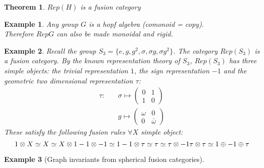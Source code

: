 \documentclass{article}
\newtheorem{example}{Example}
\newtheorem{theorem}{Theorem}
\begin{document}
	\begin{theorem}
		$Rep(H)$ is a fusion category
	\end{theorem}
	
	\begin{example}
		Any group $G$ is a hopf algebra (comonoid = copy).\\
		Therefore $RepG$ can also be made monoidal and rigid.
	\end{example}
	
	\begin{example}
		Recall the group $S_3=\{e, g, g^2, \sigma, \sigma g, \sigma g^2 \}$. The category $Rep(S_3)$ is a fusion category. By the known representation theory of $S_3$, $Rep(S_3)$ has three simple objects: the trivial representation $1$, the sign representation $-1$ and the geometric two dimensional representation $\tau$:
		\begin{equation*}
		\begin{split}
		\tau : \quad & \sigma \mapsto \left( {\begin{array}{cc} 0 & 1 \\ 1 & 0 \end{array}}\right) \\
		& g \mapsto \left( {\begin{array}{cc} \omega & 0 \\ 0 & \bar{\omega} \end{array}}\right)
		\end{split}
		\end{equation*}
		These satisfy the following fusion rules $\forall X$ simple object:
		\begin{equation}
		1 \otimes X \simeq X \simeq X \otimes 1\\
		-1 \otimes -1 \simeq 1\\
		-1 \otimes \tau \simeq \tau \simeq \tau \otimes -1\\
		\tau \otimes \tau \simeq 1 \oplus -1 \oplus \tau\\
		\end{equation}
		
	\end{example}
	
	\begin{example}[Graph invariants from spherical fusion categories]
	\end{example}
	
\end{document}
